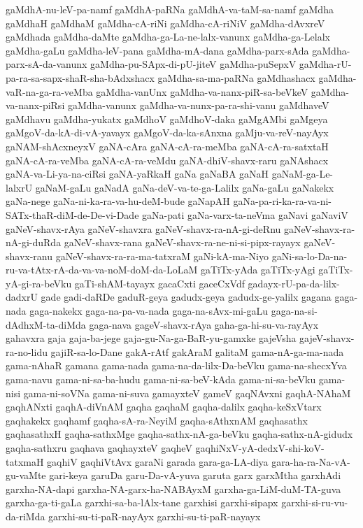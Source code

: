 {gaMdhA-nu-leV-pa-namf
gaMdhA-paRNa
gaMdhA-va-taM-sa-namf
gaMdha
gaMdhaH
gaMdhaM
gaMdha-cA-riNi
gaMdha-cA-riNiV
gaMdha-dAvxreV
gaMdhada
gaMdha-daMte
gaMdha-ga-La-ne-lalx-vanunx
gaMdha-ga-Lelalx
gaMdha-gaLu
gaMdha-leV-pana
gaMdha-mA-dana
gaMdha-parx-sAda
gaMdha-parx-sA-da-vanunx
gaMdha-pu-SApx-di-pU-jiteV
gaMdha-puSepxV
gaMdha-rU-pa-ra-sa-sapx-shaR-sha-bAdxshacx
gaMdha-sa-ma-paRNa
gaMdhashacx
gaMdha-vaR-na-ga-ra-veMba
gaMdha-vanUnx
gaMdha-va-nanx-piR-sa-beVkeV
gaMdha-va-nanx-piRsi
gaMdha-vanunx
gaMdha-va-nunx-pa-ra-shi-vanu
gaMdhaveV
gaMdhavu
gaMdha-yukatx
gaMdhoV
gaMdhoV-daka
gaMgAMbi
gaMgeya
gaMgoV-da-kA-di-vA-yavayx
gaMgoV-da-ka-sAnxna
gaMju-va-reV-nayAyx
gaNAM-shAcxneyxV
gaNA-cAra
gaNA-cA-ra-meMba
gaNA-cA-ra-satxtaH
gaNA-cA-ra-veMba
gaNA-cA-ra-veMdu
gaNA-dhiV-shavx-raru
gaNAshacx
gaNA-va-Li-ya-na-ciRsi
gaNA-yaRkaH
gaNa
gaNaBA
gaNaH
gaNaM-ga-Le-lalxrU
gaNaM-gaLu
gaNadA
gaNa-deV-va-te-ga-Lalilx
gaNa-gaLu
gaNakekx
gaNa-nege
gaNa-ni-ka-ra-va-hu-deM-bude
gaNapAH
gaNa-pa-ri-ka-ra-va-ni-SATx-thaR-diM-de-De-vi-Dade
gaNa-pati
gaNa-varx-ta-neVma
gaNavi
gaNaviV
gaNeV-shavx-rAya
gaNeV-shavxra
gaNeV-shavx-ra-nA-gi-deRnu
gaNeV-shavx-ra-nA-gi-duRda
gaNeV-shavx-rana
gaNeV-shavx-ra-ne-ni-si-pipx-rayayx
gaNeV-shavx-ranu
gaNeV-shavx-ra-ra-ma-tatxraM
gaNi-kA-ma-Niyo
gaNi-sa-lo-Da-na-ru-va-tAtx-rA-da-va-va-noM-doM-da-LoLaM
gaTiTx-yAda
gaTiTx-yAgi
gaTiTx-yA-gi-ra-beVku
gaTi-shAM-tayayx
gacaCxti
gaceCxVdf
gadayx-rU-pa-da-lilx-dadxrU
gade
gadi-daRDe
gaduR-geya
gadudx-geya
gadudx-ge-yalilx
gagana
gaga-nada
gaga-nakekx
gaga-na-pa-va-nada
gaga-na-sAvx-mi-gaLu
gaga-na-si-dAdhxM-ta-diMda
gaga-nava
gageV-shavx-rAya
gaha-ga-hi-su-va-rayAyx
gahavxra
gaja
gaja-ba-jege
gaja-gu-Na-ga-BaR-yu-gamxke
gajeVsha
gajeV-shavx-ra-no-lidu
gajiR-sa-lo-Dane
gakA-rAtf
gakAraM
galitaM
gama-nA-ga-ma-nada
gama-nAhaR
gamana
gama-nada
gama-na-da-lilx-Da-beVku
gama-na-shecxYva
gama-navu
gama-ni-sa-ba-hudu
gama-ni-sa-beV-kAda
gama-ni-sa-beVku
gama-nisi
gama-ni-soVNa
gama-ni-suva
gamayxteV
gameV
gaqNAvxni
gaqhA-NAhaM
gaqhANxti
gaqhA-diVnAM
gaqha
gaqhaM
gaqha-dalilx
gaqha-keSxVtarx
gaqhakekx
gaqhamf
gaqha-sA-ra-NeyiM
gaqha-sAthxnAM
gaqhasathx
gaqhasathxH
gaqha-sathxMge
gaqha-sathx-nA-ga-beVku
gaqha-sathx-nA-gidudx
gaqha-sathxru
gaqhava
gaqhayxteV
gaqheV
gaqhiNxV-yA-dedxV-shi-koV-tatxmaH
gaqhiV
gaqhiVtAvx
garaNi
garada
gara-ga-LA-diya
gara-ha-ra-Na-vA-gu-vaMte
gari-keya
garuDa
garu-Da-vA-yuva
garuta
garx
garxMtha
garxhAdi
garxha-NA-dapi
garxha-NA-garx-ha-NABAyxM
garxha-ga-LiM-duM-TA-guva
garxha-ga-ti-gaLa
garxhi-sa-ba-lAlx-tane
garxhisi
garxhi-sipapx
garxhi-si-ru-vu-da-riMda
garxhi-su-ti-paR-nayAyx
garxhi-su-ti-paR-nayayx
}
